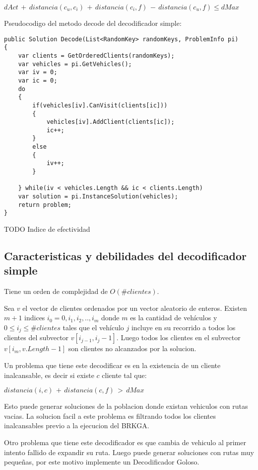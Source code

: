 \bigskip

\( dAct\, +\, distancia(c_u, c_i)\, +\, distancia(c_i, f)\, -\, distancia(c_u, f) \leq dMax\)

\bigskip

Pseudocodigo del metodo decode del decodificador simple:

\bigskip

\begin{lstlisting} 
public Solution Decode(List<RandomKey> randomKeys, ProblemInfo pi)
{
	var clients = GetOrderedClients(randomKeys);
	var vehicles = pi.GetVehicles();	
	var iv = 0;
	var ic = 0;	
	do
	{
		if(vehicles[iv].CanVisit(clients[ic]))
		{
			vehicles[iv].AddClient(clients[ic]);
			ic++;
		}
		else
		{
			iv++;			
		}
		
	} while(iv < vehicles.Length && ic < clients.Length)	
	var solution = pi.InstanceSolution(vehicles);
	return problem;
}
\end{lstlisting}

\bigskip

TODO Indice de efectividad

\subsection{Caracteristicas y debilidades del decodificador simple}

Tiene un orden de complejidad de $O(\#clientes)$.

\bigskip

Sea $v$ el vector de clientes ordenados por un vector aleatorio de enteros. Existen $m+1$ indices $i_0 = 0, i_1, i_2, .., i_m$ donde $m$ es la cantidad de vehículos y $0 \leq i_j \leq \#clientes$ tales que el vehículo $j$ incluye en su recorrido a todos los clientes del subvector $v[i_{j-1}, i_j-1]$. Luego todos los clientes en el subvector $v[i_m, v.Length - 1]$ son clientes no alcanzados por la solucion.

\bigskip

Un problema que tiene este decodificar es en la existencia de un cliente inalcansable, es decir si existe $c$ cliente tal que:

\( distancia(i, c)\, +\, distancia(c, f)\, >\, dMax\)

Esto puede generar soluciones de la poblacion donde existan vehiculos con rutas vacias. La solucion facil a este problema es filtrando todos los clientes inalcansables previo a la ejecucion del BRKGA.

\bigskip

Otro problema que tiene este decodificador es que cambia de vehiculo al primer intento fallido de expandir su ruta. Luego puede generar soluciones con rutas muy pequeñas, por este motivo implemente un Decodificador Goloso.

